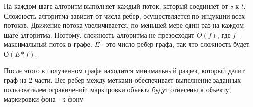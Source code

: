 На каждом шаге алгоритм выполняет каждый поток, который соединяет от $s$ к $t$. Сложность алгоритма зависит от числа ребер, осуществляется по индукции всех потоков. Движение потока увеличивается, по меньшей мере один раз на каждом шаге алгоритма. Поэтому, сложность алгоритма не превосходит $O\left(f\right)$, где  $f$ - максимальный поток в графе.  $E$ - это число ребер графа, так что сложность будет $О\left(E\ast f\right)$.

После этого в полученном графе находится минимальный разрез, который делит граф на $2$ части. Вес ребер между метками обеспечивает выполнение заданных пользователем ограничений: маркировки объекта будут отнесены к объекту, маркировки фона - к фону.
